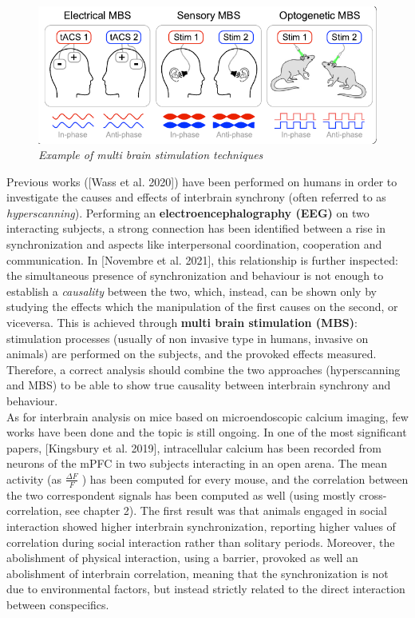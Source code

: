 \documentclass[a4paper]{article}
\begin{document}
\begin{figure}[H]
	\begin{center}
		\includegraphics[scale=.70]{novembre.png} 
	\end{center} 
	\caption{\textit{Example of multi brain stimulation techniques}}
	
\end{figure}
Previous works ([Wass et al. 2020]) have been performed on humans in order to investigate the causes and effects of interbrain synchrony (often referred to as \textit{hyperscanning}). Performing an \textbf{electroencephalography (EEG)} on two interacting subjects, a strong connection has been identified between a rise in synchronization  and aspects like interpersonal coordination, cooperation and communication. In [Novembre et al. 2021], this relationship is further inspected: the simultaneous presence of synchronization and behaviour is not enough to establish a \textit{causality} between the two, which, instead, can be shown only by studying the effects which the manipulation of the first causes on the second, or viceversa. This is achieved through \textbf{multi brain stimulation (MBS)}: stimulation processes (usually of non invasive type in humans, invasive on animals) are performed on the subjects, and the provoked effects measured. Therefore, a correct analysis should combine the two approaches (hyperscanning and MBS) to be able to show true causality between interbrain synchrony and behaviour.
\\

As for interbrain analysis on mice based on microendoscopic calcium imaging, few works have been done and the topic is still ongoing. In one of the most significant papers, [Kingsbury et al. 2019], intracellular calcium has been recorded from neurons of the mPFC in two subjects interacting in an open arena.  The mean activity (as $\frac{\Delta F }{F}$ ) has been computed for every mouse, and the correlation between the two correspondent signals has been computed as well (using mostly cross-correlation, see chapter 2). The first result was that animals engaged in social interaction showed higher interbrain synchronization, reporting higher values of correlation during social interaction rather than solitary periods. Moreover, the abolishment of physical interaction, using a barrier, provoked as well an abolishment of interbrain correlation, meaning that the synchronization is not due to environmental factors, but instead strictly related to the direct interaction between conspecifics.\\
\end{document}
